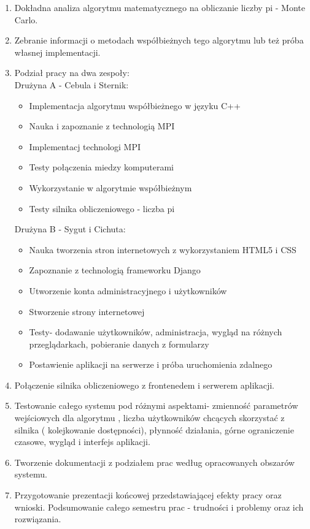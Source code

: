 \documentclass[a4paper,12pt]{article}		%
\begin{document}
\begin{enumerate}
\item Dokładna analiza algorytmu matematycznego na obliczanie liczby pi - Monte Carlo.
\item Zebranie informacji o metodach współbieżnych tego algorytmu lub też próba własnej implementacji.
\item Podział pracy na dwa zespoły:\\
Drużyna A - Cebula i Sternik:

\begin{itemize}
\item Implementacja algorytmu współbieżnego w języku C++
\item Nauka i zapoznanie z technologią MPI
\item Implementacj technologi MPI
\item Testy połączenia miedzy komputerami
\item Wykorzystanie w algorytmie współbieżnym
\item Testy silnika obliczeniowego - liczba pi
\end{itemize}

Drużyna B - Sygut i Cichuta:

\begin{itemize}
\item Nauka tworzenia stron internetowych z wykorzystaniem HTML5 i CSS
\item Zapoznanie z technologią frameworku Django
\item Utworzenie konta administracyjnego i użytkowników
\item Stworzenie strony internetowej
\item Testy- dodawanie użytkowników, administracja, wygląd na różnych przeglądarkach, pobieranie danych z formularzy
\item Postawienie aplikacji na serwerze i próba uruchomienia zdalnego
\end{itemize}

\item Połączenie silnika obliczeniowego z frontenedem i serwerem aplikacji.
\item Testowanie całego systemu pod różnymi aspektami- zmienność parametrów wejściowych dla algorytmu , liczba użytkowników chcących skorzystać z silnika ( kolejkowanie dostępności), płynność działania, górne ograniczenie czasowe, wygląd i interfejs aplikacji.
\item Tworzenie dokumentacji z podziałem prac według opracowanych obszarów systemu.
\item Przygotowanie prezentacji końcowej przedstawiającej efekty pracy oraz wnioski. Podsumowanie całego semestru prac - trudności i problemy oraz ich rozwiązania.
\end{enumerate}
\end{document}
